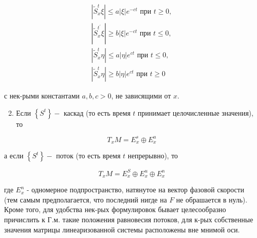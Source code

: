 \documentclass[10pt]{article}
\begin{document}
\[

\begin{gathered}

\left|\tilde{S}_{x}^{t} \xi\right| \leqslant a|\xi| e^{-c t} \text { при } t \geqslant 0, \\

\left|\tilde{S}_{x}^{t^{\prime}} \xi\right| \geqslant b|\xi| e^{-c t} \text { при } t \leqslant 0, \\

\left|\tilde{S}_{x}^{t} \eta\right| \leqslant a|\eta| e^{c t} \text { при } t \leqslant 0, \\

\left|\tilde{S}_{x}^{t} \eta\right| \geqslant b|\eta| e^{c t} \text { при } t \geqslant 0

\end{gathered}

\]



с нек-рыми константами $a, b, c>0$, не зависящими от $x$.



\begin{enumerate}

  \setcounter{enumi}{1}

  \item Если $\left\{S^{t}\right\}-$ каскад (то есть время $t$ принимает целочисленные значения), то

\end{enumerate}



\[

T_{x} M=E_{x}^{s} \oplus E_{x}^{u}

\]



а если $\left\{S^{t}\right\}-$ поток (то есть время $t$ непрерывно), то



\[

T_{x} M=E_{x}^{S} \oplus E_{x}^{u} \oplus E_{x}^{n}

\]



где $E_{x}^{n}$ - одномерное подпространство, натянутое на вектор фазовой скорости (тем самым предполагается, что последний нигде на $F$ не обрашается в нуль). Кроме того, для удобства нек-рых формулировок бывает целесообразно причислить к Г.м. такие положения равновесия потоков, для к-рых собственные значения матрицы линеаризованной системы расположены вне мнимой оси.
\end{document}
